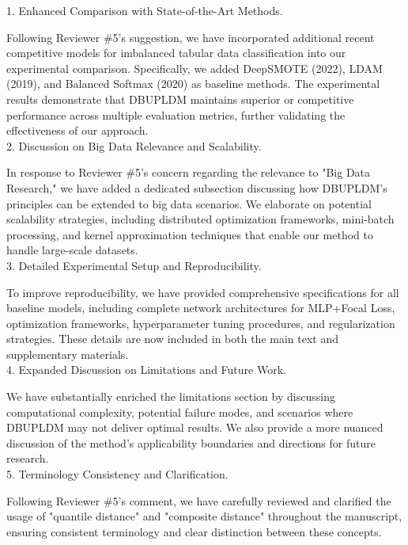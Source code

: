 \documentclass[journal,12pn, onecolumn]{IEEEtran}
\begin{document}
{\color{blue}
1. Enhanced Comparison with State-of-the-Art Methods.

Following Reviewer \#5’s suggestion, we have incorporated additional recent competitive models for imbalanced tabular data classification into our experimental comparison. Specifically, we added DeepSMOTE (2022), LDAM (2019), and Balanced Softmax (2020) as baseline methods. The experimental results demonstrate that DBUPLDM maintains superior or competitive performance across multiple evaluation metrics, further validating the effectiveness of our approach.\\

2. Discussion on Big Data Relevance and Scalability.

In response to Reviewer \#5’s concern regarding the relevance to "Big Data Research," we have added a dedicated subsection discussing how DBUPLDM’s principles can be extended to big data scenarios. We elaborate on potential scalability strategies, including distributed optimization frameworks, mini-batch processing, and kernel approximation techniques that enable our method to handle large-scale datasets.\\

3. Detailed Experimental Setup and Reproducibility.

To improve reproducibility, we have provided comprehensive specifications for all baseline models, including complete network architectures for MLP+Focal Loss, optimization frameworks, hyperparameter tuning procedures, and regularization strategies. These details are now included in both the main text and supplementary materials.\\

4. Expanded Discussion on Limitations and Future Work.

We have substantially enriched the limitations section by discussing computational complexity, potential failure modes, and scenarios where DBUPLDM may not deliver optimal results. We also provide a more nuanced discussion of the method’s applicability boundaries and directions for future research.\\

5. Terminology Consistency and Clarification.

Following Reviewer \#5’s comment, we have carefully reviewed and clarified the usage of "quantile distance" and "composite distance" throughout the manuscript, ensuring consistent terminology and clear distinction between these concepts.\\

}
\end{document}
